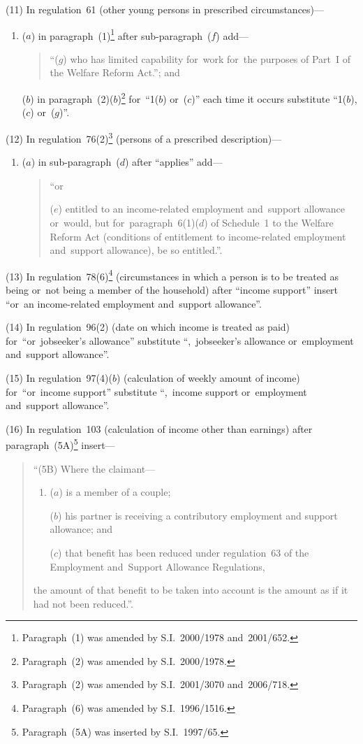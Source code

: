 \documentclass[12pt,a4paper]{article}
\begin{document}
(11) In regulation~61 (other young persons in prescribed circumstances)—
\begin{enumerate}\item[]
($a$) in paragraph~(1)\footnote{Paragraph~(1) was amended by S.I.~2000/1978 and~2001/652.} after sub-paragraph~($f$)  add—
\begin{quotation}
“($g$) who has limited capability for~work for~the purposes of Part~I of the Welfare Reform Act.”; and
\end{quotation}

($b$) in paragraph~(2)($b$)\footnote{Paragraph~(2) was amended by S.I.~2000/1978.} for~“1($b$)  or~($c$)” each time it occurs substitute “1($b$), ($c$)  or~($g$)”.
\end{enumerate}

(12) In regulation~76(2)\footnote{Paragraph~(2) was amended by S.I.~2001/3070 and~2006/718.} (persons of a prescribed description)—
\begin{enumerate}\item[]
($a$) in sub-paragraph~($d$)  after “applies” add—
\begin{quotation}
“or

($e$) entitled to an income-related employment and~support allowance or~would, but for~paragraph~6(1)($d$)  of Schedule~1 to the Welfare Reform Act (conditions of entitlement to income-related employment and~support allowance), be so entitled.”.
\end{quotation}
\end{enumerate}

(13) In regulation~78(6)\footnote{Paragraph~(6) was amended by S.I.~1996/1516.} (circumstances in which a person is to be treated as being or~not being a member of the household) after “income support” insert “or~an income-related employment and~support allowance”.

(14) In regulation~96(2) (date on which income is treated as paid) for~“or~jobseeker’s allowance” substitute “,~jobseeker’s allowance or~employment and~support allowance”.

(15) In regulation~97(4)($b$)  (calculation of weekly amount of income) for~“or~income support” substitute “,~income support or~employment and~support allowance”.

(16) In regulation~103 (calculation of income other than earnings) after paragraph~(5A)\footnote{Paragraph~(5A) was inserted by S.I.~1997/65.} insert—
\begin{quotation}
“(5B) Where the claimant—
\begin{enumerate}\item[]
($a$) is a member of a couple;

($b$) his partner is receiving a contributory employment and support allowance; and

($c$) that benefit has been reduced under regulation~63 of the Employment and~Support Allowance Regulations,
\end{enumerate}
the amount of that benefit to be taken into account is the amount as if it had not been reduced.”.
\end{quotation}
\end{document}
